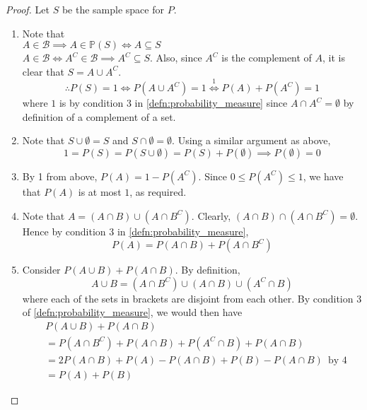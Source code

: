 \documentclass[notoc,notitlepage]{tufte-book}
\begin{document}
\begin{proof}
  Let $S$ be the sample space for $P$.
  \begin{enumerate}
    \item Note that\\
      $A \in \mathscr{B} \implies A \in \mathbb{P}(S) \iff A \subseteq S$\\
      $A \in \mathscr{B} \iff A^C \in \mathscr{B} \implies A^C \subseteq S$.
      Also, since $A^C$ is the complement of $A$, it is clear that $S = A \cup A^C$.
      \begin{equation*}
        \therefore P(S) = 1 \iff P(A \cup A^C) = 1 \overset{1}{\iff} P(A) + P(A^C) = 1
      \end{equation*}
      where $1$ is by condition 3 in \cref{defn:probability_measure} since $A \cap A^C = \emptyset$ by definition of a complement of a set.

    \item Note that $S \cup \emptyset = S$ and $S \cap \emptyset = \emptyset$. Using a similar argument as above,
      \begin{equation*}
        1 = P(S) = P(S \cup \emptyset) = P(S) + P(\emptyset) \implies P(\emptyset) = 0
      \end{equation*}

    \item By 1 from above, $P(A) = 1 - P(A^C)$. Since $0 \leq P(A^C) \leq 1$, we have that $P(A)$ is at most $1$, as required.

    \item Note that $A = (A \cap B) \cup ( A \cap B^C )$. Clearly, $(A \cap B) \cap (A \cap B^C) = \emptyset$. Hence by condition 3 in \cref{defn:probability_measure},
      \begin{equation*}
        P(A) = P(A \cap B) + P(A \cap B^C)
      \end{equation*}

    \item Consider $P(A \cup B) + P(A \cap B)$. By definition,
      \begin{equation*}
        A \cup B = (A \cap B^C) \cup (A \cap B) \cup (A^C \cap B)
      \end{equation*}
      where each of the sets in brackets are disjoint from each other. By condition 3 of \cref{defn:probability_measure}, we would then have
      \begin{align*}
        &P(A \cup B) + P(A \cap B) \\
          &= P(A \cap B^C) + P(A \cap B) + P(A^C \cap B) + P(A \cap B) \\
          &= 2 P(A \cap B) + P(A) - P(A \cap B) + P(B) - P(A \cap B) \enspace \text{by 4} \\
          &= P(A) + P(B)
      \end{align*}


\end{enumerate}
\end{proof}
\end{document}

